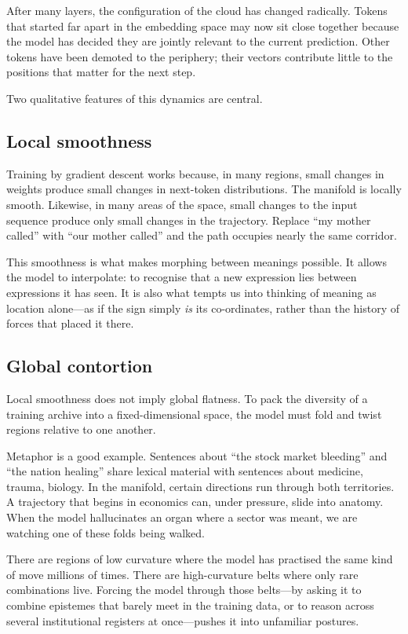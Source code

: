 \documentclass[12pt,a4paper]{article}
\begin{document}
After many layers, the configuration of the cloud has changed radically. Tokens that started far apart in the embedding space may now sit close together because the model has decided they are jointly relevant to the current prediction. Other tokens have been demoted to the periphery; their vectors contribute little to the positions that matter for the next step.

Two qualitative features of this dynamics are central.

\subsection*{Local smoothness}

Training by gradient descent works because, in many regions, small changes in weights produce small changes in next-token distributions. The manifold is locally smooth. Likewise, in many areas of the space, small changes to the input sequence produce only small changes in the trajectory. Replace ``my mother called'' with ``our mother called'' and the path occupies nearly the same corridor.

This smoothness is what makes morphing between meanings possible. It allows the model to interpolate: to recognise that a new expression lies between expressions it has seen. It is also what tempts us into thinking of meaning as location alone---as if the sign simply \emph{is} its co-ordinates, rather than the history of forces that placed it there.

\subsection*{Global contortion}

Local smoothness does not imply global flatness. To pack the diversity of a training archive into a fixed-dimensional space, the model must fold and twist regions relative to one another.

Metaphor is a good example. Sentences about ``the stock market bleeding'' and ``the nation healing'' share lexical material with sentences about medicine, trauma, biology. In the manifold, certain directions run through both territories. A trajectory that begins in economics can, under pressure, slide into anatomy. When the model hallucinates an organ where a sector was meant, we are watching one of these folds being walked.

There are regions of low curvature where the model has practised the same kind of move millions of times. There are high-curvature belts where only rare combinations live. Forcing the model through those belts---by asking it to combine epistemes that barely meet in the training data, or to reason across several institutional registers at once---pushes it into unfamiliar postures.
\end{document}

